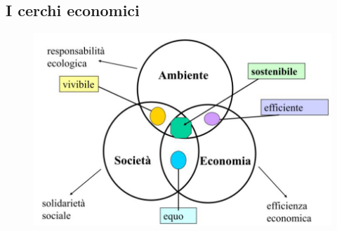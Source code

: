 \documentclass{article}
\begin{document}
\newpage
\subsection{I cerchi economici}
\begin{figure}[ht!]
    \begin{center}
        \includegraphics[width=.7\textwidth]{media/geo_civica/cerchi_economici.png}
    \end{center}
\end{figure}
\end{document}
